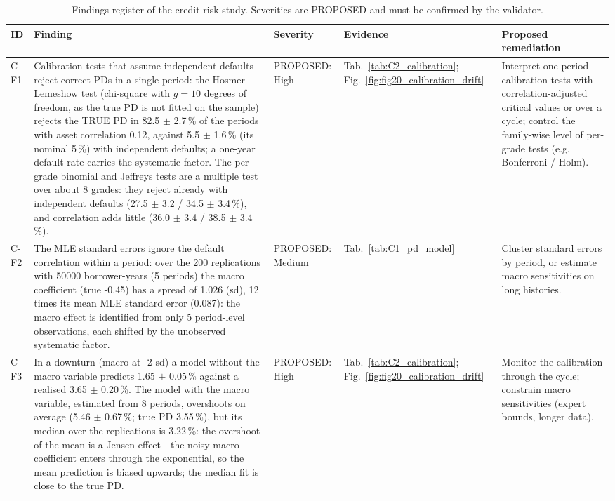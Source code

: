 \begin{table}[H]
\centering
\scriptsize
\caption{Findings register of the credit risk study. Severities are PROPOSED and must be confirmed by the validator.}
\label{tab:C6_findings}
\setlength{\tabcolsep}{3pt}
\begin{tabular}{>{\raggedright\arraybackslash}p{0.75cm}>{\raggedright\arraybackslash}p{6.6cm}>{\raggedright\arraybackslash}p{1.85cm}>{\raggedright\arraybackslash}p{2.4cm}>{\raggedright\arraybackslash}p{3.5cm}}
\toprule
ID & Finding & Severity & Evidence & Proposed remediation \\
\midrule
C-F1 & Calibration tests that assume independent defaults reject correct PDs in a single period: the Hosmer--Lemeshow test (chi-square with $g = 10$ degrees of freedom, as the true PD is not fitted on the sample) rejects the TRUE PD in 82.5 $\pm$ 2.7\,\% of the periods with asset correlation 0.12, against 5.5 $\pm$ 1.6\,\% (its nominal 5\,\%) with independent defaults; a one-year default rate carries the systematic factor. The per-grade binomial and Jeffreys tests are a multiple test over about 8 grades: they reject already with independent defaults (27.5 $\pm$ 3.2 / 34.5 $\pm$ 3.4\,\%), and correlation adds little (36.0 $\pm$ 3.4 / 38.5 $\pm$ 3.4\,\%). & PROPOSED: High & Tab.~\ref{tab:C2_calibration}; Fig.~\ref{fig:fig20_calibration_drift} & Interpret one-period calibration tests with correlation-adjusted critical values or over a cycle; control the family-wise level of per-grade tests (e.g. Bonferroni / Holm). \\
C-F2 & The MLE standard errors ignore the default correlation within a period: over the 200 replications with 50000 borrower-years (5 periods) the macro coefficient (true -0.45) has a spread of 1.026 (sd), 12 times its mean MLE standard error (0.087): the macro effect is identified from only 5 period-level observations, each shifted by the unobserved systematic factor. & PROPOSED: Medium & Tab.~\ref{tab:C1_pd_model} & Cluster standard errors by period, or estimate macro sensitivities on long histories. \\
C-F3 & In a downturn (macro at -2 sd) a model without the macro variable predicts 1.65 $\pm$ 0.05\,\% against a realised 3.65 $\pm$ 0.20\,\%. The model with the macro variable, estimated from 8 periods, overshoots on average (5.46 $\pm$ 0.67\,\%; true PD 3.55\,\%), but its median over the replications is 3.22\,\%: the overshoot of the mean is a Jensen effect - the noisy macro coefficient enters through the exponential, so the mean prediction is biased upwards; the median fit is close to the true PD. & PROPOSED: High & Tab.~\ref{tab:C2_calibration}; Fig.~\ref{fig:fig20_calibration_drift} & Monitor the calibration through the cycle; constrain macro sensitivities (expert bounds, longer data). \\

\end{tabular}
\end{table}
